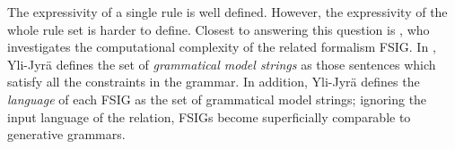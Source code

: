The expressivity of a single rule is well defined. However, the expressivity of the whole rule set is harder to define. 
%
%
%
Closest to answering this question is 
\cite{yli-jyra2003describing,yli-jyra2004fsig_dependency} ,
who investigates the computational complexity of the related formalism FSIG.
In \cite{yli-jyra2005phd}, Yli-Jyrä defines the set of \emph{grammatical model strings} 
as those sentences which satisfy all the constraints in the grammar. In addition, Yli-Jyrä \cite{yli-jyra2005phd} defines the \emph{language} of each FSIG as the set of grammatical model strings; ignoring the input language of the relation, FSIGs become superficially comparable to generative grammars.

